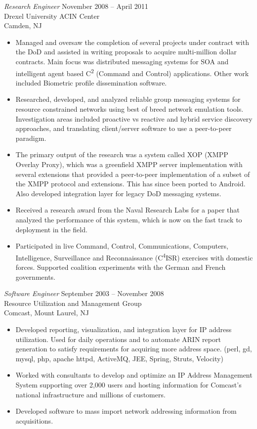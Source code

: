 \documentclass[margin]{res}
\begin{document}
\begin{resume}
  {\sl Research Engineer} \hfill  November 2008 -- April 2011 \\
    Drexel University ACIN Center \\
    Camden, NJ
    \begin{itemize}  \itemsep -2pt
      \item Managed and oversaw the completion of several projects under contract with the DoD and assisted in writing proposals to acquire multi-million dollar contracts.  Main focus was distributed messaging systems for SOA and intelligent agent based C\textsuperscript{2} (Command and Control) applications. Other work included Biometric profile dissemination software.
      \item Researched, developed, and analyzed reliable group messaging systems for resource constrained networks using best of breed network emulation tools.  Investigation areas included proactive vs reactive and hybrid service discovery approaches, and translating client/server software to use a peer-to-peer paradigm.
      \item The primary output of the research was a system called XOP (XMPP Overlay Proxy), which was a greenfield XMPP server implementation with several extensions that provided a peer-to-peer implementation of a subset of the XMPP protocol and extensions.  This has since been ported to Android. Also developed integration layer for legacy DoD messaging systems.
      \item Received a research award from the Naval Research Labs for a paper that analyzed the performance of this system, which is now on the fast track to deployment in the field.
      \item Participated in live Command, Control, Communications, Computers, Intelligence, Surveillance and Reconnaissance (C\textsuperscript{4}ISR) exercises  with domestic forces. Supported coalition experiments with the German and French governments.
    \end{itemize}


  {\sl Software Engineer} \hfill  September 2003 -- November 2008 \\
    Resource Utilization and Management Group \\
    Comcast, Mount Laurel, NJ
    \begin{itemize}  \itemsep -2pt
      \item Developed reporting, visualization, and integration layer for IP address utilization. Used for daily operations and to automate ARIN report generation to satisfy requirements for acquiring more address space. (perl, gd, mysql, php, apache httpd, ActiveMQ, JEE, Spring, Struts, Velocity)
      \item Worked with consultants to develop and optimize an IP Address Management System supporting over 2,000 users and hosting information for Comcast's national infrastructure and millions of customers.
      \item Developed software to mass import network addressing information from acquisitions.
    \end{itemize}



\end{resume}
\end{document}
